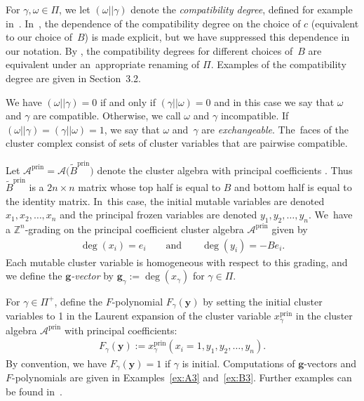 \documentclass[pdftex]{sigma}%
\def\Z{{\mathbb Z}}
\def\A{{\mathcal{A}}}
\def\prin{{\operatorname{prin}}}
\def\tB{{\tilde B}}
\def\tB{{\tilde B}}
\def\y{{\mathbf y}}
\def\g{{\mathbf g}}
\numberwithin{equation}{section}
\begin{document}
\bigskip{} %
For $\gamma,\omega \in \Pi$, we let $(\omega||\gamma)$ denote the \emph{compatibility degree}, defined for example in~\cite[Proposition~5.1]{YZ}. In~\cite{YZ}, the dependence of the compatibility degree on the choice of $c$ (equivalent to our choice of~$B$) is made explicit, but we have suppressed this dependence in our notation. By \cite[Section~5]{YZ}, the compatibility degrees for different choices of~$B$ are equivalent under an~appropriate renaming of $\Pi$. Examples of the compatibility degree are given in Section~3.2.

We have $(\omega||\gamma) = 0$ if and only if $(\gamma||\omega) = 0$ and in this case we say that $\omega$ and $\gamma$ are compatible. Otherwise, we call $\omega$ and $\gamma$ incompatible. If~$(\omega||\gamma) = (\gamma||\omega) = 1$, we say that $\omega$ and~$\gamma$ are {\it exchangeable}. The~faces of the cluster complex consist of sets of cluster variables that are pairwise compatible.

\bigskip{}
Let $\A^{\prin} = \A\big(\tB^\prin\big)$ denote the cluster algebra with principal coefficients \cite{CA4}. Thus $\tB^{\prin}$ is a $2n \times n$ matrix whose top half is equal to $B$ and bottom half is equal to the identity matrix. In~this case, the initial mutable variables are denoted $x_1,x_2,\dots,x_n$ and the principal frozen variables are denoted $y_1,y_2,\dots,y_n$. We~have a $\Z^n$-grading on
the principal coefficient cluster algebra $\A^\prin$ given by
\begin{gather}\label{eq:prindeg}
\deg(x_i) = e_i \qquad \text{and} \qquad \deg(y_i) = -B e_i.
\end{gather}
Each mutable cluster variable is homogeneous with respect to this grading, and we define the \emph{$\g$-vector} by $\g_\gamma := \deg(x_\gamma)$ for $\gamma \in \Pi$.

\bigskip{}
For $\gamma \in \Pi^+$, define the $F$-polynomial $F_\gamma(\y)$ by setting the initial cluster variables to 1 in the Laurent expansion of the cluster variable $x^\prin_\gamma$ in the cluster algebra $\A^\prin$ with principal coefficients:
\begin{gather*}
F_\gamma(\y) := x^\prin_\gamma(x_i = 1, y_1,y_2,\dots,y_n).
\end{gather*}
By convention, we have $F_\gamma(\y) = 1$ if $\gamma$ is initial. Computations of $\g$-vectors and $F$-polynomials are given in Examples~\ref{ex:A3} and~\ref{ex:B3}. Further examples can be found in~\cite{BDMTY,CA4}.
\end{document}
